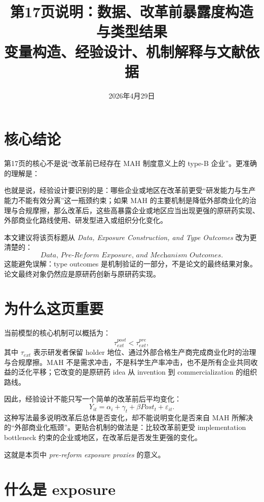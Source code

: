 \documentclass[12pt]{ctexart}
\title{第17页说明：数据、改革前暴露度构造与类型结果\\\large 变量构造、经验设计、机制解释与文献依据}
\author{}
\date{2026年4月29日}
\begin{document}
\maketitle

\section*{核心结论}

第17页的核心不是说“改革前已经存在 MAH 制度意义上的 type-B 企业”。更准确的理解是：
\begin{center}
\end{center}
也就是说，经验设计要识别的是：哪些企业或地区在改革前更受“研发能力与生产能力不能有效分离”这一瓶颈约束；如果 MAH 的主要机制是降低外部商业化的治理与合规摩擦，那么改革后，这些高暴露企业或地区应当出现更强的原研药实现、外部商业化路线使用、研发型进入或组织分化变化。

本文建议将该页标题从 \textit{Data, Exposure Construction, and Type Outcomes} 改为更清楚的：
\[
\boxed{\textit{Data, Pre-Reform Exposure, and Mechanism Outcomes}.}
\]
这能避免误解：type outcomes 是机制验证的一部分，不是论文的最终结果对象。论文最终对象仍然应是原研药创新与原研药实现。

\section{为什么这页重要}

当前模型的核心机制可以概括为：
\[
\tau_{ext}^{post}<\tau_{ext}^{pre},
\]
其中 $\tau_{ext}$ 表示研发者保留 holder 地位、通过外部合格生产商完成商业化时的治理与合规摩擦。MAH 不是需求冲击，不是科学生产率冲击，也不是所有企业共同收益的泛化平移；它改变的是原研药 idea 从 invention 到 commercialization 的组织路线。

因此，经验设计不能只写一个简单的改革前后平均变化：
\[
Y_{it}=\alpha_i+\gamma_t+\beta Post_t+\varepsilon_{it}.
\]
这种写法最多说明改革后总体是否变化，却不能说明变化是否来自 MAH 所解决的“外部商业化瓶颈”。更贴合机制的做法是：比较改革前更受 implementation bottleneck 约束的企业或地区，在改革后是否发生更强的变化。

这就是本页中 \textit{pre-reform exposure proxies} 的意义。

\section{什么是 exposure}
\end{document}
